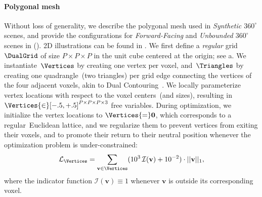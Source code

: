 \paragraph{Polygonal mesh} 
Without loss of generality, we describe the polygonal mesh used in \textit{Synthetic $360^{\circ}$} scenes, and provide the configurations for \textit{Forward-Facing} and \textit{Unbounded $360^{\circ}$} scenes in \SupplementaryMaterial (). 2D illustrations can be found in .
We first define a \textit{regular} grid $\DualGrid$ of size $P {\times} P {\times} P$ in the unit cube centered at the origin; see a.
We instantiate~$\Vertices$ by creating one vertex per voxel, and~$\Triangles$ by creating one quadrangle~(two triangles) per grid edge connecting the vertices of the four adjacent voxels, akin to Dual Contouring~\cite{ju2002dual,chen2022ndc}.
We locally parameterize vertex locations with respect to the voxel centers~(and sizes), resulting in $\Vertices {\in} [-.5, +.5]^{P {\times} P {\times} P {\times} 3}$ free variables.
During optimization, we initialize the vertex locations to $\Vertices{=}\mathbf{0}$, which corresponds to a regular~Euclidean lattice, and 
we regularize them to prevent vertices from exiting their voxels, and to promote their return to their neutral position whenever the optimization problem is under-constrained:
\begin{align}
\mathcal{L}_\Vertices = 
\sum_{\mathbf{v} \in \Vertices}
(10^{3}\,\mathcal{I}(\mathbf{v}) + 10^{-2}) \cdot ||\mathbf{v}||_1,
\end{align}
where the indicator function $\mathcal{I}(\mathbf{v}) {\equiv} 1$ whenever $\mathbf{v}$ is outside its corresponding voxel.


